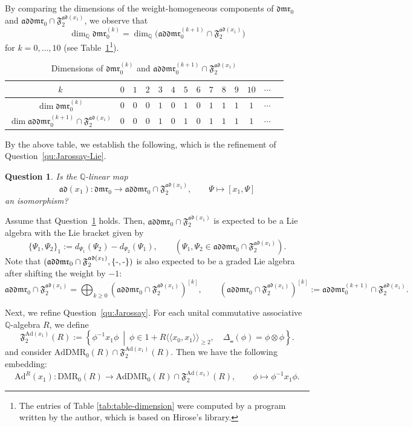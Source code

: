 \documentclass[15pt,oneside,reqno]{amsart}
\newtheorem{qu}[df]{Question}
\theoremstyle{remark}{
\newtheorem{lem}[df]{Lemma}
\newtheorem{prop}[df]{Proposition}
\newtheorem{ex}[df]{Example}
\newtheorem{rmk}[df]{Remark}
}
\newcommand{\Q}{\mathbb{Q}}
\newcommand{\DMR}{\mathrm{DMR}}
\newcommand{\dmr}{\mathfrak{dmr}}
\newcommand{\AdDMR}{\mathrm{AdDMR}}
\newcommand{\addmr}{\mathfrak{addmr}}
\newcommand{\Ad}{\mathrm{Ad}}
\newcommand{\ad}{\mathfrak{ad}}
\newcommand{\Fad}{\mathfrak{F}_2^{\ad(x_1)}}
\newcommand{\FAd}{\mathfrak{F}_2^{\Ad(x_1)}}
\begin{document}
By comparing the dimensions of the weight-homogeneous components of $\dmr_0$ and $\addmr_0\cap \Fad$, we observe that
\[
\dim_{\Q}\dmr_0^{(k)} = \dim_{\Q}\bigl(\addmr_0^{(k+1)} \cap \Fad\bigr)
\]
for $k = 0,\ldots,10$ (see Table~\ref{tab:table-dimension}\footnote{The entries of Table \eqref{tab:table-dimension} were computed by a program written by the author, which is based on Hirose's library.}).

\begin{table}[h]
\centering
\begin{tabular}{c|ccccccccccccc}
$k$ & $0$ & $1$ & $2$ & $3$ & $4$ & $5$ & $6$ & $7$ & $8$ & $9$ & $10$ &  $\cdots$ \\
\hline
$\dim \dmr_0^{(k)}$ & $0$ & $0$ & $0$ & $1$ & $0$ & $1$ & $0$ & $1$ & $1$ & $1$ & $1$ &   $\cdots$ \\
$\dim \addmr_0^{(k+1)} \cap \Fad$
& $0$ & $0$ & $0$ & $1$ & $0$ & $1$ & $0$ & $1$ & $1$ & $1$ & $1$ & $\cdots$
 \\
\end{tabular}
\caption{Dimensions of $\dmr_0^{(k)}$ and $\addmr_0^{(k+1)} \cap \Fad$}
\label{tab:table-dimension}
\end{table}

By the above table, we establish the following, which is the refinement of Question~\ref{qu:Jarossay-Lie}.

\begin{qu}\label{qu:addmr-Lie}
Is the $\Q$-linear map
\[
\ad(x_1)\colon \dmr_0 \longrightarrow \addmr_0 \cap \Fad,\qquad \Psi \longmapsto [x_1,\Psi]
\]
an isomorphism?
\end{qu}

\begin{rmk}\label{rmk:addmr-bracker}
Assume that Question~\ref{qu:addmr-Lie} holds. Then, $\addmr_0 \cap \Fad$ is expected to be a Lie algebra with the Lie bracket given by
\[
\{\Psi_1,\Psi_2\}_1 := d_{\Psi_1}(\Psi_2) - d_{\Psi_2}(\Psi_1), \qquad (\Psi_1, \Psi_2 \in \addmr_0\cap \Fad).
\]
Note that $(\addmr_0 \cap \Fad, \{\mathchar`-,\mathchar`-\})$ is also expected to be a graded Lie algebra after shifting the weight by $-1$:
\[
\addmr_0 \cap \Fad = \bigoplus_{k\ge 0} (\addmr_0 \cap \Fad)^{[k]},\qquad (\addmr_0 \cap \Fad)^{[k]} := \addmr_0^{(k+1)} \cap \Fad.
\] 
\end{rmk}




Next, we refine Question~\ref{qu:Jarossay}.
For each unital commutative associative $\Q$-algebra $R$, we define
\[
\FAd(R)
:=
\left\{
\phi^{-1}x_1\phi
\ \middle|\
\phi\in 1+R\langle\langle x_0,x_1\rangle\rangle_{\ge 2},
\quad
\Delta_{\shuffle}(\phi)=\phi\otimes\phi
\right\}.
\]
and consider $\AdDMR_0(R) \cap \FAd(R)$. Then we have the following embedding:
\[
\Ad^R(x_1)\colon \DMR_0(R) \longrightarrow \AdDMR_0(R) \cap \FAd(R),\qquad \phi \longmapsto \phi^{-1} x_1 \phi.
\]
\end{document}
